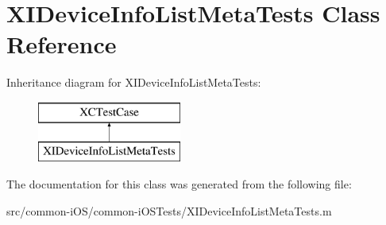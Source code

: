 \hypertarget{interface_x_i_device_info_list_meta_tests}{}\section{X\+I\+Device\+Info\+List\+Meta\+Tests Class Reference}
\label{interface_x_i_device_info_list_meta_tests}
Inheritance diagram for X\+I\+Device\+Info\+List\+Meta\+Tests\+:\begin{figure}[H]
\begin{center}
\leavevmode
\includegraphics[height=2.000000cm]{interface_x_i_device_info_list_meta_tests}
\end{center}
\end{figure}


The documentation for this class was generated from the following file\+:\begin{DoxyCompactItemize}
\item 
src/common-\/i\+O\+S/common-\/i\+O\+S\+Tests/X\+I\+Device\+Info\+List\+Meta\+Tests.\+m\end{DoxyCompactItemize}
